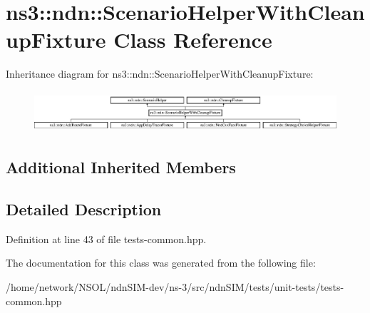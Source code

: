 \hypertarget{classns3_1_1ndn_1_1ScenarioHelperWithCleanupFixture}{}\section{ns3\+:\+:ndn\+:\+:Scenario\+Helper\+With\+Cleanup\+Fixture Class Reference}
\label{classns3_1_1ndn_1_1ScenarioHelperWithCleanupFixture}
Inheritance diagram for ns3\+:\+:ndn\+:\+:Scenario\+Helper\+With\+Cleanup\+Fixture\+:\begin{figure}[H]
\begin{center}
\leavevmode
\includegraphics[height=1.544118cm]{classns3_1_1ndn_1_1ScenarioHelperWithCleanupFixture}
\end{center}
\end{figure}
\subsection*{Additional Inherited Members}


\subsection{Detailed Description}


Definition at line 43 of file tests-\/common.\+hpp.



The documentation for this class was generated from the following file\+:\begin{DoxyCompactItemize}
\item 
/home/network/\+N\+S\+O\+L/ndn\+S\+I\+M-\/dev/ns-\/3/src/ndn\+S\+I\+M/tests/unit-\/tests/tests-\/common.\+hpp\end{DoxyCompactItemize}
